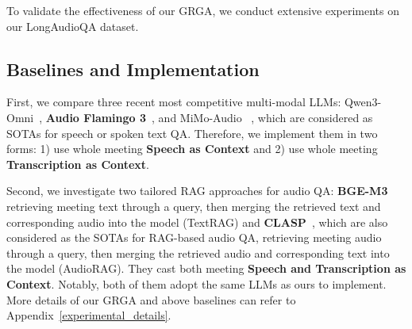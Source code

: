 \documentclass[11pt]{article}
\begin{document}
To validate the effectiveness of our GRGA, we conduct extensive experiments on our LongAudioQA dataset.


\subsection{Baselines and Implementation}

First, we compare three recent most competitive multi-modal LLMs: Qwen3-Omni~\cite{Qwen3-Omni}, \textbf{Audio Flamingo 3}~\cite{goel2025audioflamingo3advancing}, and MiMo-Audio ~\cite{coreteam2025mimoaudio}, which are considered as SOTAs for speech or spoken text QA. Therefore, we implement them in two forms: 1) use whole meeting \textbf{Speech as Context} and 2) use whole meeting \textbf{Transcription as Context}.

Second, we investigate two tailored RAG approaches for audio QA: \textbf{BGE-M3}~\cite{chen2024bgem3embeddingmultilingualmultifunctionality} retrieving meeting text through a query, then merging the retrieved text and corresponding audio into the model (TextRAG) and \textbf{CLASP}~\cite{CLASP}, which are also considered as the SOTAs for RAG-based audio QA, retrieving meeting audio through a query, then merging the retrieved audio and corresponding text into the model (AudioRAG). They cast both meeting \textbf{Speech and Transcription as Context}. Notably, both of them adopt the same LLMs as ours to implement. More details of our GRGA and above baselines can refer to Appendix~\ref{experimental_details}. 
\end{document}
